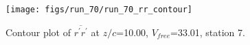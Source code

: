 \begin{figure}[H]
\centering
\texttt{[image: figs/run\_70/run\_70\_rr\_contour]}
\caption{Contour plot of $\overline{r^\prime r^\prime}$ at $z/c$=10.00, $V_{free}$=33.01, station 7.}
\end{figure}


